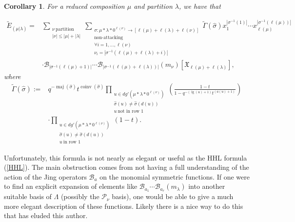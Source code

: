 \documentclass[11pt]{article}
\newtheorem{coro}[theo]{Corollary}
\theoremstyle{definition}
\numberwithin{equation}{section}
\DeclareMathOperator{\maj}{maj}
\DeclareMathOperator{\coinv}{coinv}
\DeclareMathOperator{\mathleg}{lg}
\begin{document}
\begin{coro}\label{formula for stable macdonald}
    For a reduced composition $\mu$ and partition $\lambda$, we have that
    
    \begin{align*}
        \widetilde{E}_{(\mu|\lambda)} = &\sum_{\substack{\nu ~ \text{partition}  \\ |\nu| \leq |\mu|+|\lambda|}} \sum_{\substack{\sigma:\mu*\lambda * 0^{\ell(\nu)} \rightarrow [\ell(\mu)+\ell(\lambda)+\ell(\nu)]\\ \text{non-attacking} \\ \forall i = 1,\ldots,\ell(\nu) \\ \nu_i = |\sigma^{-1}(\ell(\mu)+\ell(\lambda)+i)|}}\widetilde{\Gamma}(\widehat{\sigma}) x_1 ^{|\sigma^{-1}(1)|}\cdots x_{\ell(\mu)} ^{|\sigma^{-1}(\ell(\mu))|} ~ \\
       & \cdot \mathscr{B}_{|\sigma^{-1}(\ell(\mu)+1)|}\cdots \mathscr{B}_{|\sigma^{-1}(\ell(\mu)+\ell(\lambda))|}( m_{\nu})[\mathfrak{X}_{\ell(\mu)+ \ell(\lambda)}],
    \end{align*} 
where 
\begin{align*}
\widetilde{\Gamma}(\widehat{\sigma}) := {} &q^{-\maj(\widehat{\sigma})}t^{\coinv(\widehat{\sigma})} \prod_{\substack{ u \in dg'(\mu*\lambda * 0^{\ell(\nu)}) \\ \widehat{\sigma}(u) \neq \widehat{\sigma}(d(u)) \\ u ~ \text{not in row } 1 }} \left( \frac{1-t}{1-q^{-(\mathleg(u)+1)}t^{(a(u)+1)}} \right) \\
& \cdot \prod_{\substack{ u \in dg'(\mu * \lambda * 0^{\ell(\nu)}) \\ \widehat{\sigma}(u) \neq \widehat{\sigma}(d(u)) \\ u ~ \text{in row } 1 }} \left( 1-t \right) .
\end{align*}
\end{coro}

Unfortunately, this formula is not nearly as elegant or useful as the HHL formula (\ref{HHL}). The main obstruction comes from not having a full understanding of the action of the Jing operators $\mathscr{B}_a$ on the monomial symmetric functions. If one were to find an explicit expansion of elements like $\mathscr{B}_{a_1}\cdots \mathscr{B}_{a_r}(m_{\lambda})$ into another suitable basis of $\Lambda$ (possibly the $\mathcal{P}_{\nu}$ basis), one would be able to give a much more elegant description of these functions. Likely there is a nice way to do this that has eluded this author.
\end{document}
